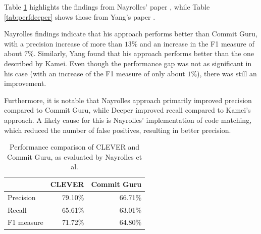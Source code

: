 Table \ref{tab:perfclever} highlights the findings from Nayrolles' paper \cite{Nayrolles2018}, while Table \ref{tab:perfdeeper} shows those from Yang's paper \cite{Yang2015}.

Nayrolles findings indicate that his approach performs better than Commit Guru, with a precision increase of more than $13\%$ and an increase in the F1 measure of about $7\%$. Similarly, Yang found that his approach performs better than the one described by Kamei. Even though the performance gap was not as significant in his case (with an increase of the F1 measure of only about $1\%$), there was still an improvement. 

Furthermore, it is notable that Nayrolles approach primarily improved precision compared to Commit Guru, while Deeper improved recall compared to Kamei's approach. 
A likely cause for this is Nayrolles' implementation of code matching, which reduced the number of false positives, resulting in better precision.


\begin{table}[t]
	\centering
	\caption{Performance comparison of CLEVER and Commit Guru, as evaluated by Nayrolles et al. \cite{Nayrolles2018}}
	\begin{tabular}{@{}lrr@{}}
		\toprule
		& \multicolumn{1}{l}{CLEVER} & \multicolumn{1}{l}{Commit Guru} \\ \midrule
		Precision  & 79.10\%                    & 66.71\%                         \\
		Recall     & 65.61\%                    & 63.01\%                         \\
		F1 measure & 71.72\%                    & 64.80\%                         \\ \bottomrule
	\end{tabular}
	\label{tab:perfclever}
\end{table}

